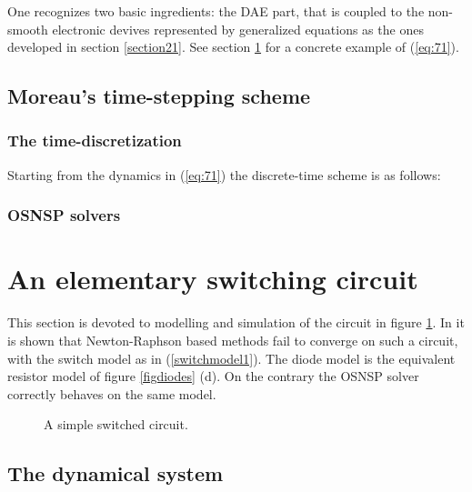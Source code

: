 One recognizes two basic ingredients: the DAE part, that is coupled to the non-smooth electronic devives represented by generalized equations as the ones developed in section \ref{section21}. See section \ref{section3} for a concrete example of (\ref{eq:71}). 




\subsection{Moreau's time-stepping scheme}
\label{section24}



\subsubsection{The time-discretization}

Starting from the dynamics in (\ref{eq:71}) the discrete-time scheme is as follows:


\subsubsection{OSNSP solvers}







\section{An elementary switching circuit}
\label{section3}


This section is devoted to modelling and simulation of the circuit in figure \ref{fig:figcircuit1}. In \cite{maffezzoni2006} it is shown that Newton-Raphson based methods fail to converge on such a circuit, with the switch model as in (\ref{switchmodel1}). The diode model is the equivalent resistor model of figure \ref{figdiodes} (d). On the contrary the OSNSP solver correctly behaves on the same model.  

\begin{figure}[h]
  \centering
   \scalebox{0.9}{
  
  }
  \caption{A simple switched circuit.}
  \label{fig:figcircuit1}
\end{figure}

\subsection{The dynamical system}
\label{section31}

